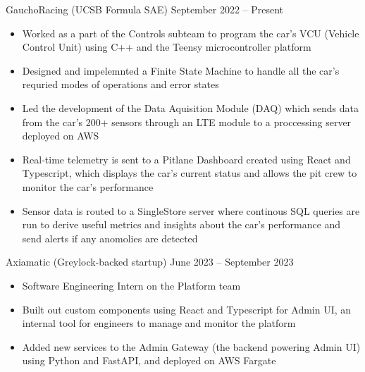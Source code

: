 \documentclass[9pt]{developercv} %
\begin{document}
\vspace{-18 pt}
\vspace{-4 pt}
\begin{entrylist}
    \vspace{-4 pt}
    \entry
		{}
		{GauchoRacing (UCSB Formula SAE)}
		{September 2022 – Present}
		{\vspace{-10pt}
        \begin{itemize}[noitemsep,topsep=0pt,parsep=0pt,partopsep=0pt, leftmargin=10pt]
            \item Worked as a part of the Controls subteam to program the car's VCU (Vehicle Control Unit) using C++ and the Teensy microcontroller platform
            \item Designed and impelemnted a Finite State Machine to handle all the car's requried modes of operations and error states
            \item Led the development of the Data Aquisition Module (DAQ) which sends data from the car's 200+ sensors through an LTE module to a proccessing server deployed on AWS
            \item Real-time telemetry is sent to a Pitlane Dashboard created using React and Typescript, which displays the car's current status and allows the pit crew to monitor the car's performance
            \item Sensor data is routed to a SingleStore server where continous SQL queries are run to derive useful metrics and insights about the car's performance and send alerts if any anomolies are detected
        \end{itemize}}
    \vspace{-4 pt}
	\entry
        {}
		{Axiamatic (Greylock-backed startup)}
		{June 2023 – September 2023}
		{\vspace{-10pt}
        \begin{itemize}[noitemsep,topsep=0pt,parsep=0pt,partopsep=0pt, leftmargin=10pt]
            \item Software Engineering Intern on the Platform team
            \item Built out custom components using React and Typescript for Admin UI, an internal tool for engineers to manage and monitor the platform
            \item Added new services to the Admin Gateway (the backend powering Admin UI) using Python and FastAPI, and deployed on AWS Fargate

\end{itemize}}
\end{entrylist}
\end{document}
